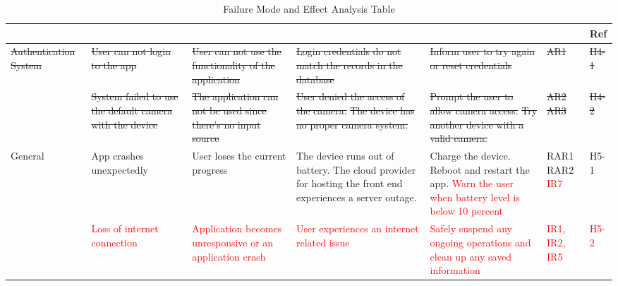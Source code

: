 \documentclass{article}
\begin{document}
\begin{landscape}
\begin{table}[h!]
\def\arraystretch{1.7}
\begin{tabularx}{1.2\textwidth} { |X|X|X|X|X
  | p{0.9cm}
  | p{0.9cm} | }
\hline
	\centering{Component} & \centering{Failure Mode} & \centering{Effects of Failure} & \centering{Causes of Failure} & \centering{Recommended Action} & \centering{SR} & Ref \\ \hline
     \sout{Authentication System} & \sout{User can not login to the app} & \sout{User can not use the functionality of the application}  & \sout{Login credentials do not match the records in the database} & \sout{Inform user to try again or reset credentials} & \sout{AR1} & \sout{H4-1} \\ \cline{2-7}
     ~ & \sout{System failed to use the default camera with the device}  & \sout{The application can not be used since there's no input source} & 
    \sout{User denied the access of the camera.}  \newline
    \sout{The device has no proper camera system.}
     & 
     \sout{Prompt the user to allow camera access.} \newline
     \sout{Try another device with a valid camera.}
     & \sout{AR2} \newline \sout{AR3} & \sout{H4-2} \\ \hline   

    General & App crashes unexpectedly & User loses the current progress  &
    The device runs out of battery. \newline 
    The cloud provider for hosting the front end experiences a server outage.  &
    \sout{Charge the device. \newline 
    Reboot and restart the app.
    } \textcolor{red}{Warn the user when battery level is below 10 percent} & 
    \sout{RAR1 \newline
    RAR2} \textcolor{red}{IR7}
    &  H5-1 \\  \cline{2-7}
    ~ & \textcolor{red}{Loss of internet connection} & \textcolor{red}{Application becomes unresponsive or an application crash} & \textcolor{red}{User experiences an internet related issue} & \textcolor{red}{Safely suspend any ongoing operations and clean up any saved information} & \textcolor{red}{IR1, IR2, IR5} & \textcolor{red}{H5-2} \\   
    \hline

\end{tabularx}
\caption{Failure Mode and Effect Analysis Table}
\label{FMEA Table}
\end{table}
\end{landscape}
\end{document}
